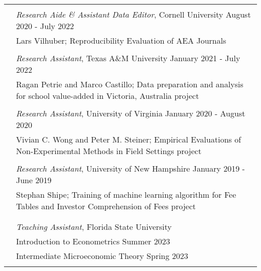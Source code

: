 \documentclass[letterpaper, 11pt]{article}
\begin{document}
\begin{longtable}{p{0.1in}p{5.9in}}




\multicolumn{2}{l}{\color{Maroon}{RESEARCH EXPERIENCE}}\\

& \textit{Research Aide \& Assistant Data Editor}, Cornell University \hfill August 2020 - July 2022 \\
& Lars Vilhuber; Reproducibility Evaluation of AEA Journals \\ 
& \\

& \textit{Research Assistant}, Texas A\&M University \hfill January 2021 - July 2022 \\
& Ragan Petrie and Marco Castillo;  Data preparation and analysis for school value-added in Victoria, Australia project \\ & \\

& \textit{Research Assistant}, University of Virginia \hfill January 2020 - August 2020 \\
& Vivian C. Wong and Peter M. Steiner; Empirical Evaluations of Non-Experimental Methods in Field Settings project \\ & \\

& \textit{Research Assistant}, University of New Hampshire \hfill January 2019 - June 2019 \\
& Stephan Shipe; Training of machine learning algorithm for Fee Tables and Investor Comprehension of Fees project \\ & \\


\multicolumn{2}{l}{\color{Maroon}{TEACHING EXPERIENCE}} \\
& \textit{Teaching Assistant}, Florida State University \\
& \hspace{10pt} Introduction to Econometrics  \hfill Summer 2023\\
& \hspace{10pt} Intermediate Microeconomic Theory  \hfill Spring 2023\\ & \\


\end{longtable}
\end{document}
